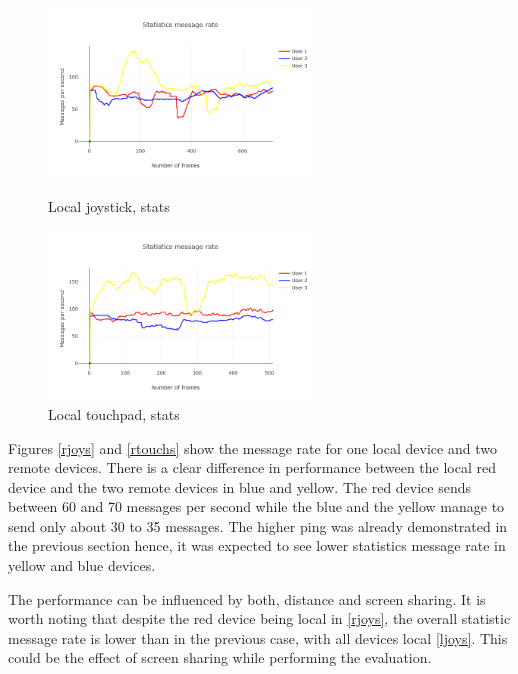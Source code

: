 \documentclass{l4proj}
\begin{document}
\begin{figure}[h!]
    \centering
    \begin{minipage}{0.45\textwidth}
        \centering
        \includegraphics[width=7cm]{./images/ljoysmess.png} %
        \caption{Local joystick, stats}
        \label{ljoys}
    \end{minipage}\hfill
    \begin{minipage}{0.45\textwidth}
        \centering
        \includegraphics[width=7cm]{./images/ltouchsmess.png} %
        \caption{Local touchpad, stats}
        \label{ltouchs}
    \end{minipage}
\end{figure}

Figures \ref{rjoys} and \ref{rtouchs} show the message rate for one local device and two remote devices. 
There is a clear difference in performance between the local red device and the two remote devices in blue and yellow. The red device sends between 60 and 70 messages per second while the blue and the yellow manage to send only about 30 to 35 messages. The higher ping was already demonstrated in the previous section hence, it was expected to see lower statistics message rate in yellow and blue devices. \par 
The performance can be influenced by both, distance and screen sharing. It is worth noting that despite the red device being local in \ref{rjoys}, the overall statistic message rate is lower than in the previous case, with all devices local \ref{ljoys}. This could be the effect of screen sharing while performing the evaluation.
\end{document}
